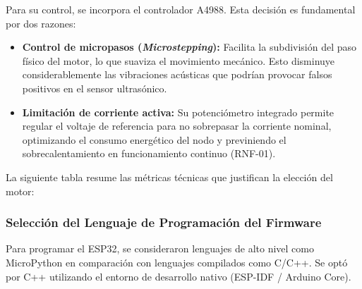 Para su control, se incorpora el controlador A4988. Esta decisión es fundamental por dos razones:
\begin{itemize}
    \item \textbf{Control de micropasos (\textit{Microstepping}):} Facilita la subdivisión del paso físico del motor, lo que suaviza el movimiento mecánico. Esto disminuye considerablemente las vibraciones acústicas que podrían provocar falsos positivos en el sensor ultrasónico.
    \item \textbf{Limitación de corriente activa:} Su potenciómetro integrado permite regular el voltaje de referencia para no sobrepasar la corriente nominal, optimizando el consumo energético del nodo y previniendo el sobrecalentamiento en funcionamiento continuo (RNF-01).
\end{itemize}

La siguiente tabla resume las métricas técnicas que justifican la elección del motor:

\begin{table}[H]
\centering
{}
\caption{Comparativa técnica de motores.}
\label{tab:comparativa_motores}
\end{table}

\subsubsection*{Selección del Lenguaje de Programación del Firmware}

Para programar el ESP32, se consideraron lenguajes de alto nivel como MicroPython en comparación con lenguajes compilados como C/C++. Se optó por C++ utilizando el entorno de desarrollo nativo (ESP-IDF / Arduino Core).

